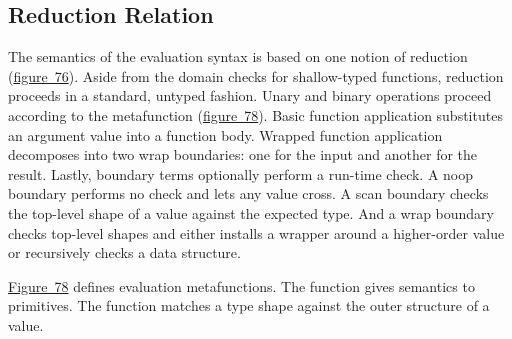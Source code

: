 \documentclass[ twoside,open=right,titlepage,numbers=noenddot,headinclude,%
                footinclude=true,cleardoublepage=empty,abstract=off,
                BCOR=5mm,paper=a4,fontsize=11pt,%
                ngerman,american,%
                parts,pdfspacing]{scrreprt}
\newcommand{\Ssubsubsection}[2]{\subsubsection[#1]{#2}}
\newcommand{\FigureRef}[2]{#1}
\renewcommand{\Ssubsubsection}[2]{\subsection[#1]{#2}}
\begin{document}
\Ssubsubsection{Reduction Relation}{Reduction Relation}\label{t:x28part_x22secx3abothx3amodelx3areductionx22x29}

The semantics of the evaluation syntax is based on one notion of reduction (\hyperref[t:x28counter_x28x22figurex22_x22figx3abothx3arrx22x29x29]{figure~\FigureRef{76}{t:x28counter_x28x22figurex22_x22figx3abothx3arrx22x29x29}}).
Aside from the domain checks for shallow{-}typed functions, reduction proceeds
 in a standard, untyped fashion.
Unary and binary operations proceed according to the \relax{$\sdelta$} metafunction (\hyperref[t:x28counter_x28x22figurex22_x22figx3abothx3aextrax2drrx22x29x29]{figure~\FigureRef{78}{t:x28counter_x28x22figurex22_x22figx3abothx3aextrax2drrx22x29x29}}).
Basic function application substitutes an argument value into a function body.
Wrapped function application decomposes into two wrap boundaries: one
 for the input and another for the result.
Lastly, boundary terms optionally perform a run{-}time check.
A noop boundary performs no check and lets any value cross.
A scan boundary checks the top{-}level shape of a value against the expected
 type.
And a wrap boundary checks top{-}level shapes and either installs a wrapper
 around a higher{-}order value or recursively checks a data structure.

\hyperref[t:x28counter_x28x22figurex22_x22figx3abothx3aextrax2drrx22x29x29]{Figure~\FigureRef{78}{t:x28counter_x28x22figurex22_x22figx3abothx3aextrax2drrx22x29x29}} defines evaluation metafunctions.
The \relax{$\sdelta$} function gives semantics to primitives.
The \relax{$\sshallow$} function matches a type shape against the outer structure of a value.
\end{document}
